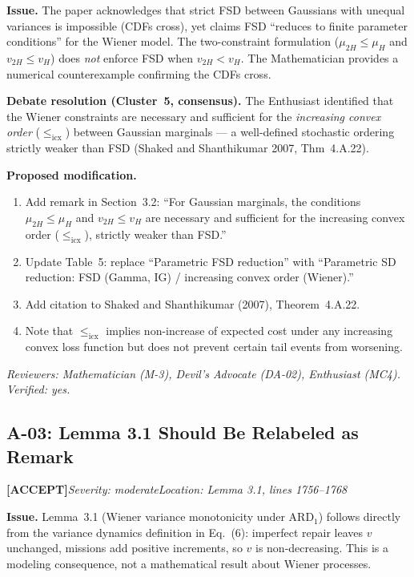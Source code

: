 \documentclass[11pt,a4paper]{article}
\newcommand{\acceptlabel}{\textbf{\textcolor{acceptgreen}{[ACCEPT]}}}
\begin{document}
\textbf{Issue.} The paper acknowledges that strict FSD between Gaussians with unequal variances is impossible (CDFs cross), yet claims FSD ``reduces to finite parameter conditions'' for the Wiener model. The two-constraint formulation ($\mu_{2H}\le\mu_H$ and $v_{2H}\le v_H$) does \emph{not} enforce FSD when $v_{2H}<v_H$. The Mathematician provides a numerical counterexample confirming the CDFs cross.

\textbf{Debate resolution (Cluster~5, consensus).} The Enthusiast identified that the Wiener constraints are necessary and sufficient for the \emph{increasing convex order} ($\le_{\mathrm{icx}}$) between Gaussian marginals --- a well-defined stochastic ordering strictly weaker than FSD (Shaked and Shanthikumar 2007, Thm~4.A.22).

\textbf{Proposed modification.}
\begin{enumerate}[nosep,leftmargin=1.5em]
  \item Add remark in Section~3.2: ``For Gaussian marginals, the conditions $\mu_{2H}\le\mu_H$ and $v_{2H}\le v_H$ are necessary and sufficient for the increasing convex order ($\le_{\mathrm{icx}}$), strictly weaker than FSD.''
  \item Update Table~5: replace ``Parametric FSD reduction'' with ``Parametric SD reduction: FSD (Gamma, IG) / increasing convex order (Wiener).''
  \item Add citation to Shaked and Shanthikumar (2007), Theorem~4.A.22.
  \item Note that $\le_{\mathrm{icx}}$ implies non-increase of expected cost under any increasing convex loss function but does not prevent certain tail events from worsening.
\end{enumerate}

\textit{Reviewers: Mathematician (M-3), Devil's Advocate (DA-02), Enthusiast (MC4). Verified: yes.}

\bigskip

\subsection{A-03: Lemma 3.1 Should Be Relabeled as Remark}
\acceptlabel\quad\textit{Severity: moderate}\quad\textit{Location: Lemma 3.1, lines 1756--1768}

\textbf{Issue.} Lemma~3.1 (Wiener variance monotonicity under ARD$_1$) follows directly from the variance dynamics definition in Eq.~(6): imperfect repair leaves $v$ unchanged, missions add positive increments, so $v$ is non-decreasing. This is a modeling consequence, not a mathematical result about Wiener processes.
\end{document}

